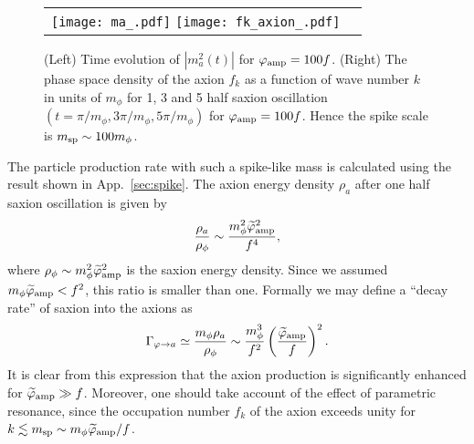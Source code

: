 \documentclass[12pt, a4paper]{article}
\begin{document}
\begin{figure}[t]
\begin{center}
\begin{tabular}{cc}
\texttt{[image: ma\_.pdf]}
\hspace{5mm}
\texttt{[image: fk\_axion\_.pdf]}
\end{tabular}
\end{center}
\caption {
(Left) Time evolution of $|m_a^2(t)|$ for $\varphi_{\rm amp} = 100f$.
(Right) The phase space density of the axion $f_k$ as a function of wave number $k$ in units of $m_\phi$
for 1, 3 and 5 half saxion oscillation $(t=\pi/m_\phi, 3\pi/m_\phi, 5\pi/m_\phi)$ for $\varphi_{\rm amp} = 100f$.
Hence the spike scale is $m_{\rm sp} \sim 100 m_\phi$.
}
\label{fig:fk_axion}
\end{figure}



The particle production rate with such a spike-like mass is calculated using the result shown in App.~\ref{sec:spike}.
The axion energy density $\rho_a$ after one half saxion oscillation is given by
\begin{align}
	\frac{\rho_a}{\rho_\phi} \sim \frac{m_\phi^2 \widetilde \varphi_{\rm amp}^2}{f^4},
\end{align}
where $\rho_\phi \sim m_\phi^2 \widetilde \varphi_{\rm amp}^2$ is the saxion energy density.
Since we assumed $m_\phi \widetilde \varphi_{\rm amp} < f^2$, this ratio is smaller than one.
Formally we may define a ``decay rate'' of saxion into the axions as
\begin{align}
	\Gamma_{\varphi\to a} \simeq\frac{m_\phi \rho_a}{\rho_\phi} \sim \frac{m_\phi^3}{f^2}
	\left( \frac{\widetilde \varphi_{\rm amp}}{f} \right)^{2}.
\end{align}
It is clear from this expression that the axion production is significantly enhanced for $\widetilde \varphi_{\rm amp} \gg f$.
Moreover, one should take account of the effect of parametric resonance,
since the occupation number $f_k$ of the axion exceeds unity for $k \lesssim m_{\rm sp} \sim m_\phi \widetilde\varphi_{\rm amp}/f$. 
\end{document}
